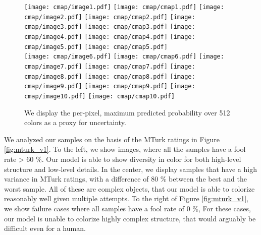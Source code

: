 \documentclass{article} \usepackage{iclr2021_conference,times}
\begin{document}
\begin{figure}[htp]
\centering
\setlength{\lineskip}{0pt}

  \texttt{[image: cmap/image1.pdf]}
  \texttt{[image: cmap/cmap1.pdf]}
  \texttt{[image: cmap/image2.pdf]}  
  \texttt{[image: cmap/cmap2.pdf]}
  \texttt{[image: cmap/image3.pdf]}  
  \texttt{[image: cmap/cmap3.pdf]}
  \texttt{[image: cmap/image4.pdf]}
  \texttt{[image: cmap/cmap4.pdf]}
 \texttt{[image: cmap/image5.pdf]}  
  \texttt{[image: cmap/cmap5.pdf]} \\
  \texttt{[image: cmap/image6.pdf]}
  \texttt{[image: cmap/cmap6.pdf]}
  \texttt{[image: cmap/image7.pdf]}  
  \texttt{[image: cmap/cmap7.pdf]}
  \texttt{[image: cmap/image8.pdf]}  
  \texttt{[image: cmap/cmap8.pdf]}
  \texttt{[image: cmap/image9.pdf]}
  \texttt{[image: cmap/cmap9.pdf]}
  \texttt{[image: cmap/image10.pdf]}
  \texttt{[image: cmap/cmap10.pdf]}
\caption{We display the per-pixel, maximum predicted probability over 512 colors as a proxy for uncertainty.}
\label{fig:cmap_aux}
\end{figure}

We analyzed our samples on the basis of the MTurk ratings in Figure \ref{fig:mturk_v1}. To the left, we show images, where all the samples have a fool rate > 60 \%. Our model is able to show diversity in color for both high-level structure and low-level details. In the center, we display samples that have a high variance in MTurk ratings, with a difference of 80 \% between the best and the worst sample. All of these are complex objects, that our model is able to colorize reasonably well given multiple attempts. To the right of Figure \ref{fig:mturk_v1}, we show failure cases where all samples have a fool rate of 0 \%, For these cases, our model is unable to colorize highly complex structure, that would arguably be difficult even for a human.
\end{document}

